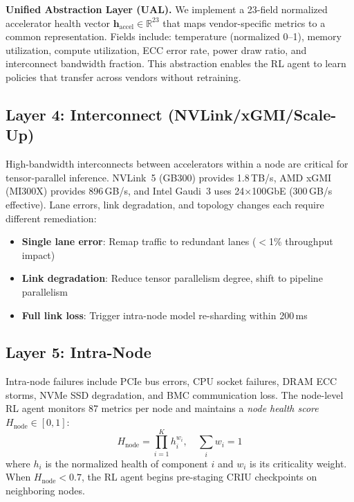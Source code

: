 \documentclass[conference,10pt,letterpaper]{IEEEtran}
\begin{document}
\textbf{Unified Abstraction Layer (UAL).} We implement a 23-field normalized accelerator health vector $\mathbf{h}_{\text{accel}} \in \mathbb{R}^{23}$ that maps vendor-specific metrics to a common representation. Fields include: temperature (normalized 0--1), memory utilization, compute utilization, ECC error rate, power draw ratio, and interconnect bandwidth fraction. This abstraction enables the RL agent to learn policies that transfer across vendors without retraining.

\subsection{Layer 4: Interconnect (NVLink/xGMI/Scale-Up)}

High-bandwidth interconnects between accelerators within a node are critical for tensor-parallel inference. NVLink~5 (GB300) provides 1.8\,TB/s, AMD xGMI (MI300X) provides 896\,GB/s, and Intel Gaudi~3 uses 24$\times$100GbE (300\,GB/s effective). Lane errors, link degradation, and topology changes each require different remediation:

\begin{itemize}
\item \textbf{Single lane error}: Remap traffic to redundant lanes ($<$1\% throughput impact)
\item \textbf{Link degradation}: Reduce tensor parallelism degree, shift to pipeline parallelism
\item \textbf{Full link loss}: Trigger intra-node model re-sharding within 200\,ms
\end{itemize}

\subsection{Layer 5: Intra-Node}

Intra-node failures include PCIe bus errors, CPU socket failures, DRAM ECC storms, NVMe SSD degradation, and BMC communication loss. The node-level RL agent monitors 87 metrics per node and maintains a \emph{node health score} $H_{\text{node}} \in [0,1]$:
\begin{equation}
H_{\text{node}} = \prod_{i=1}^{K} h_i^{w_i}, \quad \sum_{i} w_i = 1
\end{equation}
where $h_i$ is the normalized health of component $i$ and $w_i$ is its criticality weight. When $H_{\text{node}} < 0.7$, the RL agent begins pre-staging CRIU checkpoints on neighboring nodes.
\end{document}
